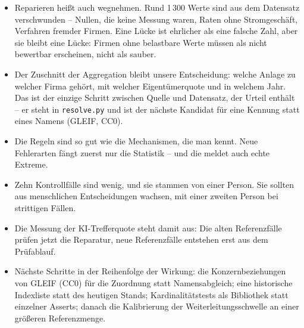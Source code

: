\documentclass[11pt,a4paper]{article}
\begin{document}
\begin{itemize}
\item Reparieren heißt auch wegnehmen. Rund 1\,300 Werte sind aus dem Datensatz verschwunden -- Nullen, die keine Messung waren, Raten ohne Stromgeschäft, Verfahren fremder Firmen. Eine Lücke ist ehrlicher als eine falsche Zahl, aber sie bleibt eine Lücke: Firmen ohne belastbare Werte müssen als nicht bewertbar erscheinen, nicht als sauber.
\item Der Zuschnitt der Aggregation bleibt unsere Entscheidung: welche Anlage zu welcher Firma gehört, mit welcher Eigentümerquote und in welchem Jahr. Das ist der einzige Schritt zwischen Quelle und Datensatz, der Urteil enthält -- er steht in \texttt{resolve.py} und ist der nächste Kandidat für eine Kennung statt eines Namens (GLEIF, CC0).
\item Die Regeln sind so gut wie die Mechanismen, die man kennt. Neue Fehlerarten fängt zuerst nur die Statistik -- und die meldet auch echte Extreme.
\item Zehn Kontrollfälle sind wenig, und sie stammen von einer Person. Sie sollten aus menschlichen Entscheidungen wachsen, mit einer zweiten Person bei strittigen Fällen.
\item Die Messung der KI-Trefferquote steht damit aus: Die alten Referenzfälle prüfen jetzt die Reparatur, neue Referenzfälle entstehen erst aus dem Prüfablauf.
\item Nächste Schritte in der Reihenfolge der Wirkung: die Konzernbeziehungen von GLEIF (CC0) für die Zuordnung statt Namensabgleich; eine historische Indexliste statt des heutigen Stands; Kardinalitätstests als Bibliothek statt einzelner Asserts; danach die Kalibrierung der Weiterleitungsschwelle an einer größeren Referenzmenge.
\end{itemize}
\end{document}
